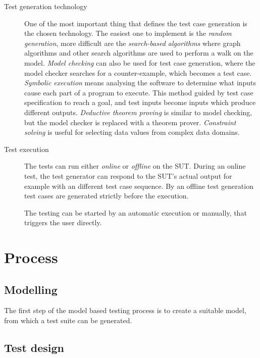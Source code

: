 \begin{description}
	\item[Test generation technology] One of the most important thing that defines the test case generation is the chosen technology. The easiest one to implement is the \textit{random generation}, more difficult are the \textit{search-based algorithms} where graph algorithms and other search algorithms are used to perform a walk on the model. \textit{Model checking} can also be used for test case generation, where the model checker searches for a counter-example, which becomes a test case. \textit{Symbolic execution} means analysing the software to determine what inputs cause each part of a program to execute. This method guided by test case specification to reach a goal, and test inputs become inputs which produce different outputs. \textit{Deductive theorem proving} is similar to model checking, but the model checker is replaced with a theorem prover. \textit{Constraint solving} is useful for selecting data values from complex data domains.
	
	\item[Test execution] The tests can run either \textit{online} or \textit{offline} on the SUT. During an online test, the test generator can respond to the SUT's actual output for example with an different test case sequence. By an offline test generation test cases are generated strictly before the execution.
	
	The testing can be started by an automatic execution or manually, that triggers the user directly.
\end{description}


\section{Process}
\label{sec:process}

\subsection{Modelling}
\label{sub:modelling}

The first step of the model based testing process is to create a suitable model, from which a test suite can be generated.


\subsection{Test design}
\label{sub:testdesign}

